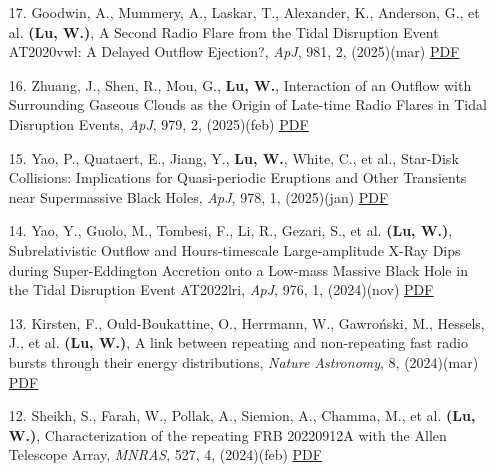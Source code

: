 \begin{itemize}[leftmargin=0.65cm]
\vspace{-0.1cm}
\item[17.]{Goodwin, A., Mummery, A., Laskar, T., Alexander, K., Anderson, G., et al. {\bf (Lu, W.)}, {A Second Radio Flare from the Tidal Disruption Event AT2020vwl: A Delayed Outflow Ejection?}, {\it ApJ}, 981, 2, (2025)(mar) \href{https://ui.adsabs.harvard.edu/abs/2025ApJ...981..122G}{\underline{PDF}}}

\vspace{-0.1cm}
\item[16.]{Zhuang, J., Shen, R., Mou, G., {\bf Lu, W.}, {Interaction of an Outflow with Surrounding Gaseous Clouds as the Origin of Late-time Radio Flares in Tidal Disruption Events}, {\it ApJ}, 979, 2, (2025)(feb) \href{https://ui.adsabs.harvard.edu/abs/2025ApJ...979..109Z}{\underline{PDF}}}

\vspace{-0.1cm}
\item[15.]{Yao, P., Quataert, E., Jiang, Y., {\bf Lu, W.}, White, C., et al., {Star‑Disk Collisions: Implications for Quasi-periodic Eruptions and Other Transients near Supermassive Black Holes}, {\it ApJ}, 978, 1, (2025)(jan) \href{https://ui.adsabs.harvard.edu/abs/2025ApJ...978...91Y}{\underline{PDF}}}

\vspace{-0.1cm}
\item[14.]{Yao, Y., Guolo, M., Tombesi, F., Li, R., Gezari, S., et al. {\bf (Lu, W.)}, {Subrelativistic Outflow and Hours-timescale Large-amplitude X-Ray Dips during Super-Eddington Accretion onto a Low-mass Massive Black Hole in the Tidal Disruption Event AT2022lri}, {\it ApJ}, 976, 1, (2024)(nov) \href{https://ui.adsabs.harvard.edu/abs/2024ApJ...976...34Y}{\underline{PDF}}}

\vspace{-0.1cm}
\item[13.]{Kirsten, F., Ould-Boukattine, O., Herrmann, W., Gawro{\'n}ski, M., Hessels, J., et al. {\bf (Lu, W.)}, {A link between repeating and non-repeating fast radio bursts through their energy distributions}, {\it Nature Astronomy}, 8, (2024)(mar) \href{https://ui.adsabs.harvard.edu/abs/2024NatAs...8..337K}{\underline{PDF}}}

\vspace{-0.1cm}
\item[12.]{Sheikh, S., Farah, W., Pollak, A., Siemion, A., Chamma, M., et al. {\bf (Lu, W.)}, {Characterization of the repeating FRB 20220912A with the Allen Telescope Array}, {\it MNRAS}, 527, 4, (2024)(feb) \href{https://ui.adsabs.harvard.edu/abs/2024MNRAS.52710425S}{\underline{PDF}}}


\end{itemize}
